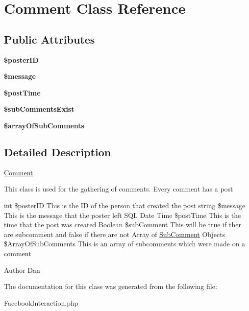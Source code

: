 \hypertarget{class_comment}{
\section{Comment Class Reference}
\label{class_comment}
}
\subsection*{Public Attributes}
\begin{DoxyCompactItemize}
\item 
\hypertarget{class_comment_a77679fccc29fb1879e7af8baa8c6218d}{
{\bfseries \$posterID}}
\label{class_comment_a77679fccc29fb1879e7af8baa8c6218d}

\item 
\hypertarget{class_comment_a2574045794599f0620598862839cf002}{
{\bfseries \$message}}
\label{class_comment_a2574045794599f0620598862839cf002}

\item 
\hypertarget{class_comment_a4d99942fec7dcd10c9ab160238ed09ac}{
{\bfseries \$postTime}}
\label{class_comment_a4d99942fec7dcd10c9ab160238ed09ac}

\item 
\hypertarget{class_comment_aaac41d0e5f7c6f937e277cbe9c546409}{
{\bfseries \$subCommentsExist}}
\label{class_comment_aaac41d0e5f7c6f937e277cbe9c546409}

\item 
\hypertarget{class_comment_a1b190367850158aca7375a0277e3a16d}{
{\bfseries \$arrayOfSubComments}}
\label{class_comment_a1b190367850158aca7375a0277e3a16d}

\end{DoxyCompactItemize}


\subsection{Detailed Description}
\hyperlink{class_comment}{Comment}

This class is used for the gathering of comments. Every comment has a post

int \$posterID This is the ID of the person that created the post string \$message This is the message that the poster left SQL Date Time \$postTime This is the time that the post was created Boolean \$subComment This will be true if ther are subcomment and false if there are not Array of \hyperlink{class_sub_comment}{SubComment} Objects \$ArrayOfSubComments This is an array of subcomments which were made on a comment \begin{DoxyAuthor}{Author}
Dan 
\end{DoxyAuthor}


The documentation for this class was generated from the following file:\begin{DoxyCompactItemize}
\item 
FacebookInteraction.php\end{DoxyCompactItemize}

